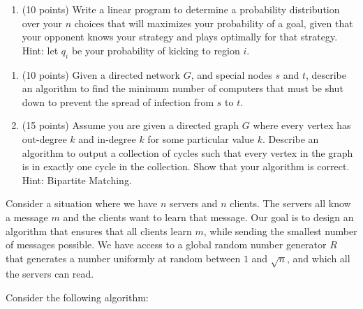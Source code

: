 \documentclass[11pt]{article}
\begin{document}
\begin{enumerate}
\begin{enumerate}
\item (10 points)   Write a linear program to determine a probability distribution over your $n$ choices that will maximizes your probability of a goal,  given that your opponent knows your strategy and plays optimally for that strategy.  Hint: let $q_{i}$ be your probability of kicking to region $i$.



\end{enumerate}

 
 
 
 \begin{enumerate}
 
A computer $s$ is initially infected with a virus in a directed network and there is a critical computer $t$ that you want to ensure will not become infected.  You are able to shut down any computers except for $s$ and $t$, and you want to prevent infection by shutting down the minimum number of computers such that there is no longer any path from $s$ to $t$.

 \item (10 points) Given a directed network $G$, and special nodes $s$ and $t$, describe an algorithm to find the minimum number of computers that must be shut down to prevent the spread of infection from $s$ to $t$.
 
 
 \pagebreak
 
 
 \item (15 points) Assume you are given a directed graph $G$ where every vertex has out-degree $k$ and in-degree $k$ for some particular value $k$.  Describe an algorithm to output a collection of cycles such that every vertex in the graph is in exactly one cycle in the collection.  Show that your algorithm is correct.  Hint: Bipartite Matching.

\end{enumerate}




Consider a situation where we have $n$ servers and $n$ clients.  The servers all know a message $m$ and the clients want to learn that message.  Our goal is to design an algorithm that ensures that all clients learn $m$, while sending the smallest number of messages possible.  We have access to a global random number generator $R$ that generates a number uniformly at random between $1$ and $\sqrt{n}$, and which all the servers can read.

Consider the following algorithm:


\end{enumerate}
\end{document}
